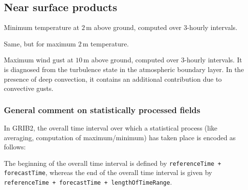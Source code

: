 \subsection{Near surface products}
\begin{description}[leftmargin=3.0cm,style=sameline]
  \item [TMIN\_2M]  Minimum temperature at $2\,\mathrm{m}$ above ground, computed over $3$-hourly intervals. 
  \item [TMAX\_2M]  Same, but for maximum $2\,\mathrm{m}$ temperature.
  \item [VMAX\_10M] Maximum wind gust at $10\,\mathrm{m}$ above ground, computed over $3$-hourly intervals. It is diagnosed 
                    from the turbulence state in the atmospheric boundary layer. In the presence of deep convection, it 
                    contains an additional contribution due to convective gusts.
\end{description}


\subsubsection{General comment on statistically processed fields}

In GRIB2, the overall time interval over which a statistical process (like averaging, computation of maximum/minimum) has taken place is 
encoded as follows:

The beginning of the overall time interval is defined by \texttt{referenceTime + forecastTime}, whereas the end of the 
overall time interval is given by \texttt{referenceTime + forecastTime + lengthOfTimeRange}.


